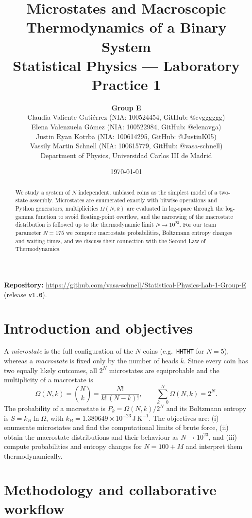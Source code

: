 \documentclass[11pt,a4paper]{article}
\title{\textbf{Microstates and Macroscopic Thermodynamics of a Binary System}\\[2pt]
\large Statistical Physics --- Laboratory Practice 1}
\author{%
  \textbf{Group E}\\
  Claudia Valiente Gutiérrez (NIA: 100524454, GitHub: @cvgggggg)\\
  Elena Valenzuela Gómez (NIA: 100522984, GitHub: @elenavga)\\
  Justin Ryan Kotrba (NIA: 100614295, GitHub: @JustinK05)\\
  Vassily Martin Schnell (NIA: 100615779, GitHub: @vasa-schnell)\\[6pt]
  \small Department of Physics, Universidad Carlos III de Madrid}
\date{\today}
\newcommand{\resN}{175}                 %
\begin{document}
\maketitle
\thispagestyle{fancy}

\begin{abstract}
We study a system of $N$ independent, unbiased coins as the simplest model of
a two-state assembly. Microstates are enumerated exactly with bitwise
operations and Python generators, multiplicities $\Omega(N,k)$ are evaluated
in log-space through the log-gamma function to avoid floating-point overflow,
and the narrowing of the macrostate distribution is followed up to the
thermodynamic limit $N\to10^{23}$. For our team parameter $N=\resN$ we compute
macrostate probabilities, Boltzmann entropy changes and waiting times, and we
discuss their connection with the Second Law of Thermodynamics.
\end{abstract}

\noindent\textbf{Repository:}
\url{https://github.com/vasa-schnell/Statistical-Physics-Lab-1-Group-E}
(release \texttt{v1.0}).

\section{Introduction and objectives}
A \emph{microstate} is the full configuration of the $N$ coins (e.g.\
\texttt{HHTHT} for $N=5$), whereas a \emph{macrostate} is fixed only by the
number of heads $k$. Since every coin has two equally likely outcomes, all
$2^N$ microstates are equiprobable and the multiplicity of a macrostate is
\begin{equation}
  \Omega(N,k)=\binom{N}{k}=\frac{N!}{k!\,(N-k)!},
  \qquad \sum_{k=0}^{N}\Omega(N,k)=2^N .
  \label{eq:omega}
\end{equation}
The probability of a macrostate is $P_k=\Omega(N,k)/2^N$ and its Boltzmann
entropy is $S=k_B\ln\Omega$, with $k_B=1.380649\times10^{-23}\,\mathrm{J\,K^{-1}}$.
The objectives are: (i) enumerate microstates and find the computational
limits of brute force, (ii) obtain the macrostate distributions and their
behaviour as $N\to10^{23}$, and (iii) compute probabilities and entropy
changes for $N=100+M$ and interpret them thermodynamically.

\section{Methodology and collaborative workflow}
\end{document}
